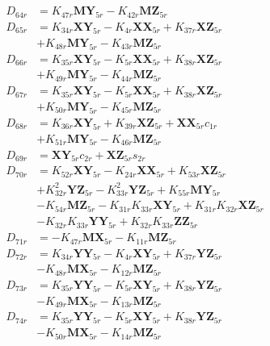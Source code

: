 \begin{align}
 \nonumber \\ 
D_{64r} &= K_{47r}\mathbf{MY}_{5r} - K_{42r}\mathbf{MZ}_{5r} \nonumber \\
D_{65r} &= K_{34r}\mathbf{XY}_{5r} - K_{4r}\mathbf{XX}_{5r} + K_{37r}\mathbf{XZ}_{5r}  \nonumber \\
&+ K_{48r}\mathbf{MY}_{5r} - K_{43r}\mathbf{MZ}_{5r} \nonumber \\
D_{66r} &= K_{35r}\mathbf{XY}_{5r} - K_{5r}\mathbf{XX}_{5r} + K_{38r}\mathbf{XZ}_{5r}  \nonumber \\
&+ K_{49r}\mathbf{MY}_{5r} - K_{44r}\mathbf{MZ}_{5r} \nonumber \\
D_{67r} &= K_{35r}\mathbf{XY}_{5r} - K_{5r}\mathbf{XX}_{5r} + K_{38r}\mathbf{XZ}_{5r}  \nonumber \\
&+ K_{50r}\mathbf{MY}_{5r} - K_{45r}\mathbf{MZ}_{5r} \nonumber \\
D_{68r} &= K_{36r}\mathbf{XY}_{5r} + K_{39r}\mathbf{XZ}_{5r} + \mathbf{XX}_{5r}c_{1r}  \nonumber \\
&+ K_{51r}\mathbf{MY}_{5r} - K_{46r}\mathbf{MZ}_{5r} \nonumber \\
D_{69r} &= \mathbf{XY}_{5r}c_{2r} + \mathbf{XZ}_{5r}s_{2r} \nonumber \\
D_{70r} &= K_{52r}\mathbf{XY}_{5r} - K_{24r}\mathbf{XX}_{5r} + K_{53r}\mathbf{XZ}_{5r}  \nonumber \\
&+ K_{32r}^2\mathbf{YZ}_{5r} - K_{33r}^2\mathbf{YZ}_{5r} + K_{55r}\mathbf{MY}_{5r}  \nonumber \\
&- K_{54r}\mathbf{MZ}_{5r} - K_{31r}K_{33r}\mathbf{XY}_{5r} + K_{31r}K_{32r}\mathbf{XZ}_{5r}  \nonumber \\
&- K_{32r}K_{33r}\mathbf{YY}_{5r} + K_{32r}K_{33r}\mathbf{ZZ}_{5r} \nonumber \\
D_{71r} &= - K_{47r}\mathbf{MX}_{5r} - K_{11r}\mathbf{MZ}_{5r} \nonumber \\
D_{72r} &= K_{34r}\mathbf{YY}_{5r} - K_{4r}\mathbf{XY}_{5r} + K_{37r}\mathbf{YZ}_{5r}  \nonumber \\
&- K_{48r}\mathbf{MX}_{5r} - K_{12r}\mathbf{MZ}_{5r} \nonumber \\
D_{73r} &= K_{35r}\mathbf{YY}_{5r} - K_{5r}\mathbf{XY}_{5r} + K_{38r}\mathbf{YZ}_{5r}  \nonumber \\
&- K_{49r}\mathbf{MX}_{5r} - K_{13r}\mathbf{MZ}_{5r} \nonumber \\
D_{74r} &= K_{35r}\mathbf{YY}_{5r} - K_{5r}\mathbf{XY}_{5r} + K_{38r}\mathbf{YZ}_{5r}  \nonumber \\
&- K_{50r}\mathbf{MX}_{5r} - K_{14r}\mathbf{MZ}_{5r} \nonumber \\

\end{align}
